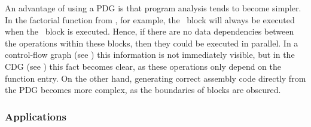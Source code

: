 %
%      
%      
%      
%

An advantage of using a \gls{PDG} is that \gls{program} analysis tends to become
simpler.
%
In the factorial \gls{function} from , for example, the
~\gls{block} will always be executed when the
~\gls{block} is executed.
%
Hence, if there are no data dependencies between the operations within these
\glspl{block}, then they could be executed in parallel.
%
In a \gls{control-flow graph} (see ) this information
is not immediately visible, but in the \gls{CDG} (see
) this fact becomes clear, as these operations only
depend on the \gls{function} entry.
%
On the other hand, generating correct \gls{assembly code} directly from the
\gls{PDG} becomes more complex, as the boundaries of \glspl{block} are obscured.


\subsubsection{Applications}

